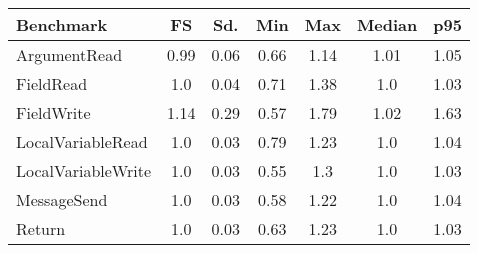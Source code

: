 \begin{center}
\begin{tabular}{l c c c c c c}
\toprule
\textbf{Benchmark} & \textbf{FS} & \textbf{Sd.} & \textbf{Min} & \textbf{Max} & \textbf{Median} & \textbf{p95}\\
\toprule

ArgumentRead & 0.99 & 0.06 & 0.66 & 1.14 & 1.01 & 1.05 \\
\midrule

FieldRead & 1.0 & 0.04 & 0.71 & 1.38 & 1.0 & 1.03 \\
\midrule

FieldWrite & 1.14 & 0.29 & 0.57 & 1.79 & 1.02 & 1.63 \\
\midrule

LocalVariableRead & 1.0 & 0.03 & 0.79 & 1.23 & 1.0 & 1.04 \\
\midrule

LocalVariableWrite & 1.0 & 0.03 & 0.55 & 1.3 & 1.0 & 1.03 \\
\midrule

MessageSend & 1.0 & 0.03 & 0.58 & 1.22 & 1.0 & 1.04 \\
\midrule

Return & 1.0 & 0.03 & 0.63 & 1.23 & 1.0 & 1.03 \\
\midrule

\end{tabular}
\end{center}